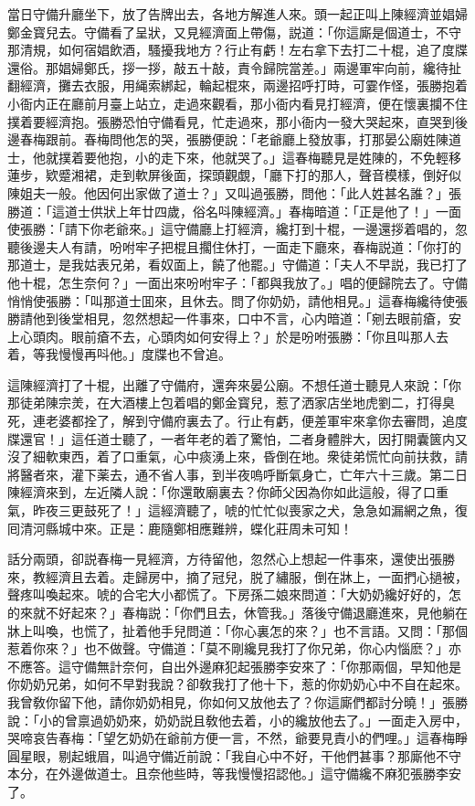 當日守備升廳坐下，放了告牌出去，各地方解進人來。頭一起正叫上陳經濟並娼婦鄭金寳兒去。守備看了呈狀，又見經濟面上帶傷，説道：「你這廝是個道士，不守那清規，如何宿娼飲酒，騷擾我地方？行止有虧！左右拿下去打二十棍，追了度牒還俗。那娼婦鄭氏，拶一拶，敲五十敲，責令歸院當差。」兩邊軍牢向前，纔待扯翻經濟，攤去衣服，用䋲索綁起，輪起棍來，兩邊招呼打時，可霎作怪，張勝抱着小衙内正在廳前月臺上站立，走過來觀看，那小衙内看見打經濟，便在懷裏攔不住撲着要經濟抱。張勝恐怕守備看見，忙走過來，那小衙内一發大哭起來，直哭到後邊春梅跟前。春梅問他怎的哭，張勝便說：「老爺廳上發放事，打那晏公廟姓陳道士，他就撲着要他抱，小的走下來，他就哭了。」這春梅聽見是姓陳的，不免輕移蓮步，欵蹙湘裙，走到軟屏後面，探頭觀覷，「廳下打的那人，聲音模樣，倒好似陳姐夫一般。他因何出家做了道士？」又叫過張勝，問他：「此人姓甚名誰？」張勝道：「這道士供狀上年廿四歲，俗名呌陳經濟。」春梅暗道：「正是他了！」一面使張勝：「請下你老爺來。」這守備廳上打經濟，纔打到十棍，一邊還拶着唱的，忽聽後邊夫人有請，吩咐牢子把棍且擱住休打，一面走下廳來，春梅説道：「你打的那道士，是我姑表兄弟，看奴面上，饒了他罷。」守備道：「夫人不早説，我已打了他十棍，怎生奈何？」一面出來吩咐牢子：「都與我放了。」唱的便歸院去了。守備悄悄使張勝：「叫那道士囬來，且休去。問了你奶奶，請他相見。」這春梅纔待使張勝請他到後堂相見，忽然想起一件事來，口中不言，心内暗道：「剜去眼前瘡，安上心頭肉。眼前瘡不去，心頭肉如何安得上？」於是吩咐張勝：「你且叫那人去着，等我慢慢再呌他。」度牒也不曾追。

這陳經濟打了十棍，出離了守備府，還奔來晏公廟。不想任道士聽見人來說：「你那徒弟陳宗羙，在大酒樓上包着唱的鄭金寳兒，惹了洒家店坐地虎劉二，打得臭死，連老婆都拴了，解到守備府裏去了。行止有虧，便差軍牢來拿你去審問，追度牒還官！」這任道士聽了，一者年老的着了驚怕，二者身體胖大，因打開囊篋内又沒了細軟東西，着了口重氣，心中痰湧上來，昏倒在地。衆徒弟慌忙向前扶救，請將醫者來，灌下薬去，通不省人事，到半夜嗚呼斷氣身亡，亡年六十三歲。第二日陳經濟來到，左近隣人說：「你還敢廟裏去？你師父因為你如此這般，得了口重氣，昨夜三更鼓死了！」這經濟聽了，唬的忙忙似喪家之犬，急急如漏網之魚，復囘清河縣城中來。正是：鹿隨鄭相應難辨，蝶化莊周未可知！

話分兩頭，卻説春梅一見經濟，方待留他，忽然心上想起一件事來，還使出張勝來，教經濟且去着。走歸房中，摘了冠兒，脱了繡服，倒在牀上，一面捫心撾被，聲疼叫喚起來。唬的合宅大小都慌了。下房孫二娘來問道：「大奶奶纔好好的，怎的來就不好起來？」春梅説：「你們且去，休管我。」落後守備退廳進來，見他躺在牀上叫喚，也慌了，扯着他手兒問道：「你心裏怎的來？」也不言語。又問：「那個惹着你來？」也不做聲。守備道：「莫不剛纔見我打了你兄弟，你心内惱麽？」亦不應答。這守備無計奈何，自出外邊麻犯起張勝李安來了：「你那兩個，早知他是你奶奶兄弟，如何不早對我說？卻敎我打了他十下，惹的你奶奶心中不自在起來。我曾敎你留下他，請你奶奶相見，你如何又放他去了？你這廝們都討分曉！」張勝說：「小的曾禀過奶奶來，奶奶説且敎他去着，小的纔放他去了。」一面走入房中，哭啼哀告春梅：「望乞奶奶在爺前方便一言，不然，爺要見責小的們哩。」這春梅睜圓星眼，剔起蛾眉，叫過守備近前說：「我自心中不好，干他們甚事？那廝他不守本分，在外邊做道士。且奈他些時，等我慢慢招認他。」這守備纔不麻犯張勝李安了。


